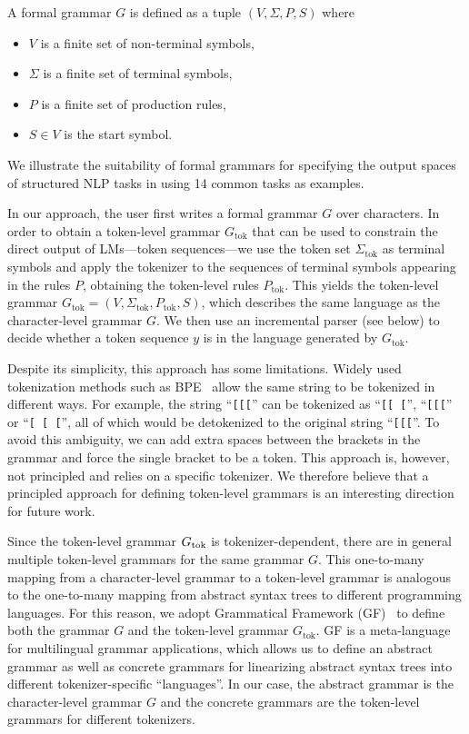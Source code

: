 A formal grammar $G$ is defined as a tuple $(V, \Sigma, P, S)$ where
\begin{itemize}
\denselist
\item $V$ is a finite set of non-terminal symbols,
\item $\Sigma$ is a finite set of terminal symbols,
\item $P$ is a finite set of production rules,
\item $S \in V$ is the start symbol.
\end{itemize}

We illustrate the suitability of formal grammars for specifying the output spaces of structured NLP tasks in  using 14 common tasks as examples.

In our approach, the user first writes a formal grammar $G$ over characters.
In order to obtain a token-level grammar $G_\text{tok}$ that can be used to constrain the direct output of LMs---token sequences---we use the token set $\Sigma_\text{tok}$ as terminal symbols and
apply the tokenizer to the sequences of terminal symbols appearing in the rules $P$, obtaining the token-level rules $P_\text{tok}$.
This yields the token-level grammar $G_\text{tok} = (V, \Sigma_\text{tok}, P_\text{tok}, S)$, which describes the same language as the character-level grammar $G$.
We then use an incremental parser (see below) to decide whether a token sequence $y$ is in the language generated by $G_\text{tok}$.

Despite its simplicity, this approach has some limitations.
Widely used tokenization methods such as BPE~\citep{bpe-sennrich-etal-2016-neural} allow the same string to be tokenized in different ways.
For example, the string ``\texttt{[[[}'' can be tokenized as ``\texttt{[[ [}'', ``\texttt{[[[}'' or ``\texttt{[ [ [}'',
all of which would be detokenized to the original string ``\texttt{[[[}''.
%
To avoid this ambiguity, we can add extra spaces between the brackets in the grammar and force the single bracket to be a token.
This approach is, however, not principled and relies on a specific tokenizer.
We therefore believe that a principled approach for defining token-level grammars is an interesting direction for future work.


Since the token-level grammar $G\textsubscript{tok}$ is tokenizer-dependent, there are in general multiple token-level grammars for the same grammar $G$.
This one-to-many mapping from a character-level grammar to a token-level grammar is analogous to the one-to-many mapping from abstract syntax trees to different programming languages.
For this reason, we adopt Grammatical Framework (GF)~\cite{ranta-2019-grammatical} to define both the grammar $G$ and the token-level grammar $G_\text{tok}$.
GF is a meta-language for multilingual grammar applications, which allows us to define an abstract grammar as well as concrete grammars for linearizing abstract syntax trees into different tokenizer\hyp specific ``languages''.
In our case, the abstract grammar is the character-level grammar $G$ and the concrete grammars are the token-level grammars for different tokenizers.


